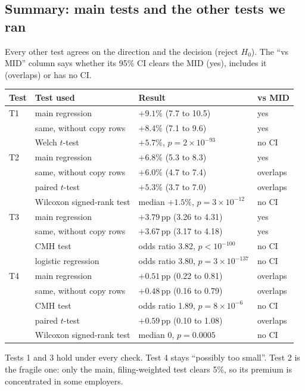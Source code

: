 \documentclass[10pt,a4paper,twocolumn]{article}
\begin{document}
\subsection*{Summary: main tests and the other tests we ran}
Every other test agrees on the direction and the decision (reject $H_0$). The ``vs MID'' column
says whether its 95\% CI clears the MID (yes), includes it (overlaps) or has no CI.
{\footnotesize
\begin{tabularx}{\linewidth}{@{}L{0.45cm} L{3.2cm} Y L{1.05cm}@{}}
\toprule
\textbf{Test} & \textbf{Test used} & \textbf{Result} & \textbf{vs MID} \\
\midrule
T1 & main regression & $+9.1\%$ (7.7 to 10.5) & yes \\
   & same, without copy rows & $+8.4\%$ (7.1 to 9.6) & yes \\
   & Welch $t$-test & $+5.7\%$, $p=2\times10^{-93}$ & no CI \\
\midrule
T2 & main regression & $+6.8\%$ (5.3 to 8.3) & yes \\
   & same, without copy rows & $+6.0\%$ (4.7 to 7.4) & overlaps \\
   & paired $t$-test & $+5.3\%$ (3.7 to 7.0) & overlaps \\
   & Wilcoxon signed-rank test & median $+1.5\%$, $p=3\times10^{-12}$ & no CI \\
\midrule
T3 & main regression & $+3.79$\,pp (3.26 to 4.31) & yes \\
   & same, without copy rows & $+3.67$\,pp (3.17 to 4.18) & yes \\
   & CMH test & odds ratio 3.82, $p<10^{-100}$ & no CI \\
   & logistic regression & odds ratio 3.80, $p=3\times10^{-137}$ & no CI \\
\midrule
T4 & main regression & $+0.51$\,pp (0.22 to 0.81) & overlaps \\
   & same, without copy rows & $+0.48$\,pp (0.16 to 0.79) & overlaps \\
   & CMH test & odds ratio 1.89, $p=8\times10^{-6}$ & no CI \\
   & paired $t$-test & $+0.59$\,pp (0.10 to 1.08) & overlaps \\
   & Wilcoxon signed-rank test & median 0, $p=0.0005$ & no CI \\
\bottomrule
\end{tabularx}}

Tests 1 and 3 hold under every check. Test 4 stays ``possibly too small''. Test 2 is the fragile
one: only the main, filing-weighted test clears 5\%, so its premium is concentrated in some
employers.
\end{document}
